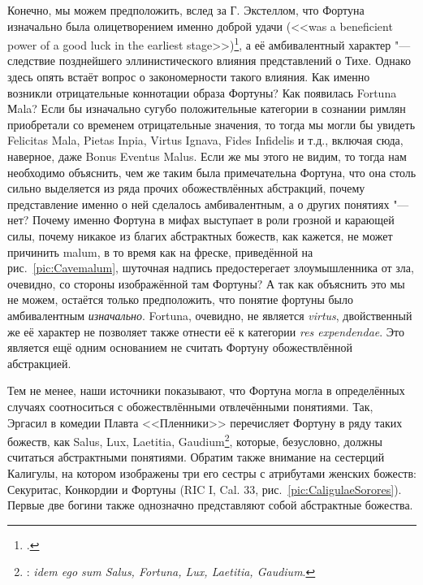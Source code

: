 Конечно, мы можем предположить, вслед за Г. Экстеллом, что Фортуна изначально была олицетворением именно доброй удачи (<<was a beneficient power of a good luck in the earliest stage>>)\footcite[P. 9]{Axtell1907}, а её амбивалентный характер "--- следствие позднейшего эллинистического влияния представлений о Тихе. Однако здесь опять встаёт вопрос о закономерности такого влияния. Как именно возникли отрицательные коннотации образа Фортуны? Как появилась Fortuna Мala? Если бы изначально сугубо положительные категории в сознании римлян приобретали со временем отрицательные значения, то тогда мы могли бы увидеть Felicitas Mala, Pietas Inpia, Virtus Ignava, Fides Infidelis и т.д., включая сюда, наверное, даже Bonus Eventus Malus. Если же мы этого не видим, то тогда нам необходимо объяснить, чем же таким была примечательна Фортуна, что она столь сильно выделяется из ряда прочих обожествлённых абстракций, почему представление именно о ней сделалось амбивалентным, а о других понятиях "--- нет? Почему именно Фортуна в мифах выступает в роли грозной и карающей силы, почему никакое из благих абстрактных божеств, как кажется, не может причинить malum, в то время как на фреске, приведённой на рис.~\ref{pic:Cavemalum}, шуточная надпись предостерегает злоумышленника от зла, очевидно, со стороны изображённой там Фортуны? А так как объяснить это мы не можем, остаётся только предположить, что понятие фортуны было амбивалентным \textit{изначально}. Fortuna, очевидно, не является \textit{virtus}, двойственный же её характер не позволяет также отнести её к категории \textit{res expendendae}. Это является ещё одним основанием не считать Фортуну обожествлённой абстракцией.

Тем не менее, наши источники показывают, что Фортуна могла в определённых случаях соотноситься с обожествлёнными отвлечёнными понятиями. Так, Эргасил в комедии Плавта <<Пленники>> перечисляет Фортуну в ряду таких божеств, как Salus, Lux, Laetitia, Gaudium\footnote{: \textit{idem ego sum Salus, Fortuna, Lux, Laetitia, Gaudium}.}, которые, безусловно, должны считаться абстрактными понятиями. Обратим также внимание на сестерций Калигулы, на котором изображены три его сестры с атрибутами женских божеств: Секуритас, Конкордии и Фортуны (RIC I, Cal. 33, рис.~\ref{pic:CaligulaeSorores}). Первые две богини также однозначно представляют собой абстрактные божества.

